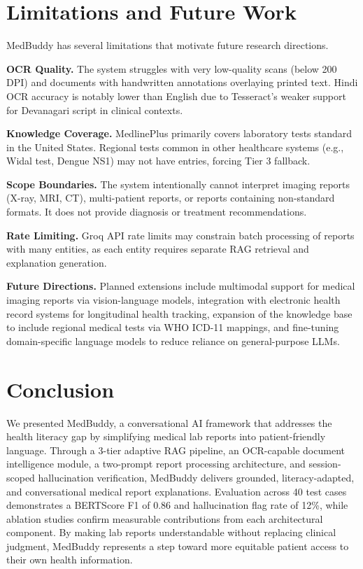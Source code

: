 \documentclass[conference]{IEEEtran}
\begin{document}
\section{Limitations and Future Work}

MedBuddy has several limitations that motivate future research directions.

\textbf{OCR Quality.} The system struggles with very low-quality scans (below 200 DPI) and documents with handwritten annotations overlaying printed text. Hindi OCR accuracy is notably lower than English due to Tesseract's weaker support for Devanagari script in clinical contexts.

\textbf{Knowledge Coverage.} MedlinePlus primarily covers laboratory tests standard in the United States. Regional tests common in other healthcare systems (e.g., Widal test, Dengue NS1) may not have entries, forcing Tier 3 fallback.

\textbf{Scope Boundaries.} The system intentionally cannot interpret imaging reports (X-ray, MRI, CT), multi-patient reports, or reports containing non-standard formats. It does not provide diagnosis or treatment recommendations.

\textbf{Rate Limiting.} Groq API rate limits may constrain batch processing of reports with many entities, as each entity requires separate RAG retrieval and explanation generation.

\textbf{Future Directions.} Planned extensions include multimodal support for medical imaging reports via vision-language models, integration with electronic health record systems for longitudinal health tracking, expansion of the knowledge base to include regional medical tests via WHO ICD-11 mappings, and fine-tuning domain-specific language models to reduce reliance on general-purpose LLMs.

\section{Conclusion}

We presented MedBuddy, a conversational AI framework that addresses the health literacy gap by simplifying medical lab reports into patient-friendly language. Through a 3-tier adaptive RAG pipeline, an OCR-capable document intelligence module, a two-prompt report processing architecture, and session-scoped hallucination verification, MedBuddy delivers grounded, literacy-adapted, and conversational medical report explanations. Evaluation across 40 test cases demonstrates a BERTScore F1 of 0.86 and hallucination flag rate of 12\%, while ablation studies confirm measurable contributions from each architectural component. By making lab reports understandable without replacing clinical judgment, MedBuddy represents a step toward more equitable patient access to their own health information.
\end{document}
